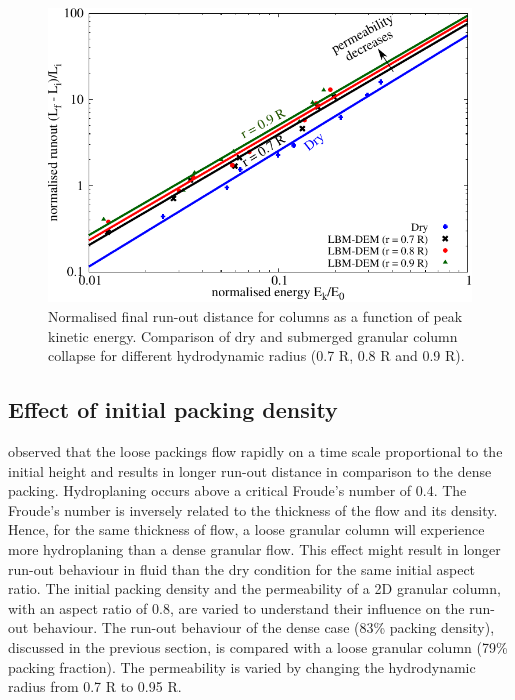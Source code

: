 \begin{landscape}
\begin{figure}
	\centering
	\includegraphics[height=0.9\textheight]{runout_fluid_dry_energy}
	\caption[Normalised final run-out distance for columns as a function of 
		peak kinetic energy in dry and submerged conditions]{Normalised final 
		run-out distance for columns as a function of 
	peak kinetic energy. Comparison of dry and submerged granular column 
	collapse for different hydrodynamic radius (0.7 R, 0.8 R and 0.9 R).}
	\label{fig:runout_fluid_dry_energy}
\end{figure}
\end{landscape}



\subsection{Effect of initial packing density}

\citet{Rondon2011} observed that the loose packings flow rapidly on a time
scale proportional to the initial height and results in longer run-out distance 
in comparison to the dense packing. Hydroplaning occurs above a critical 
Froude's number of 0.4. The Froude's number is inversely related to the 
thickness of the flow and its density. Hence, for the same thickness of flow, a 
loose granular column will experience more hydroplaning than a dense granular 
flow. This effect might result in longer run-out behaviour in fluid than the 
dry condition for the same initial aspect ratio. The initial packing density 
and the permeability of a 2D granular column, with an aspect ratio of 0.8, are 
varied to understand their influence on the run-out behaviour. The run-out 
behaviour of the dense case (83\% packing density), discussed in the previous 
section, is compared with a loose granular column (79\% packing fraction). The 
permeability is varied by changing the hydrodynamic radius from 0.7 R to 0.95 
R. 


